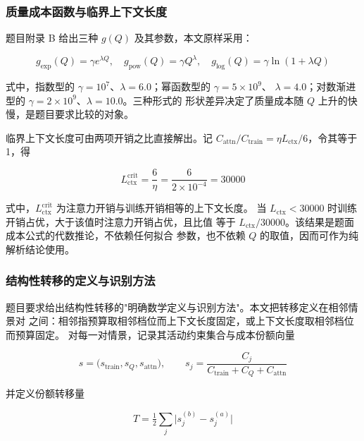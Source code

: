 \documentclass[bwprint]{gmcmthesis}
\numberwithin{equation}{section}
\numberwithin{figure}{section}
\numberwithin{table}{section}
\begin{document}
\subsubsection{质量成本函数与临界上下文长度}

题目附录 B 给出三种 $g(Q)$ 及其参数，本文原样采用：

\begin{equation}
g_{\exp}(Q)=\gamma e^{\lambda Q},\quad
g_{\mathrm{pow}}(Q)=\gamma Q^{\lambda},\quad
g_{\log}(Q)=\gamma\ln(1+\lambda Q)
\end{equation}

式中，指数型的 $\gamma=10^{7}$、$\lambda=6.0$；幂函数型的 $\gamma=5\times10^{9}$、
$\lambda=4.0$；对数渐进型的 $\gamma=2\times10^{9}$、$\lambda=10.0$。三种形式的
形状差异决定了质量成本随 $Q$ 上升的快慢，是题目要求比较的对象。

临界上下文长度可由两项开销之比直接解出。记 $C_{\mathrm{attn}}/C_{\mathrm{train}}
=\eta L_{\mathrm{ctx}}/6$，令其等于 1，得

\begin{equation}
L_{\mathrm{ctx}}^{\mathrm{crit}}=\frac{6}{\eta}=\frac{6}{2\times10^{-4}}=30000
\end{equation}

式中，$L_{\mathrm{ctx}}^{\mathrm{crit}}$ 为注意力开销与训练开销相等的上下文长度。
当 $L_{\mathrm{ctx}}<30000$ 时训练开销占优，大于该值时注意力开销占优，且比值
等于 $L_{\mathrm{ctx}}/30000$。该结果是题面成本公式的代数推论，不依赖任何拟合
参数，也不依赖 $Q$ 的取值，因而可作为纯解析结论使用。

\subsubsection{结构性转移的定义与识别方法}

题目要求给出结构性转移的"明确数学定义与识别方法"。本文把转移定义在相邻情景对
之间：相邻指预算取相邻档位而上下文长度固定，或上下文长度取相邻档位而预算固定。
对每一对情景，记录其活动约束集合与成本份额向量

\begin{equation}
s=\bigl(s_{\mathrm{train}},s_Q,s_{\mathrm{attn}}\bigr),\qquad
s_j=\frac{C_j}{C_{\mathrm{train}}+C_Q+C_{\mathrm{attn}}}
\end{equation}

并定义份额转移量

\begin{equation}
T=\tfrac12\sum_{j}\bigl|s_j^{(b)}-s_j^{(a)}\bigr|
\end{equation}
\end{document}
